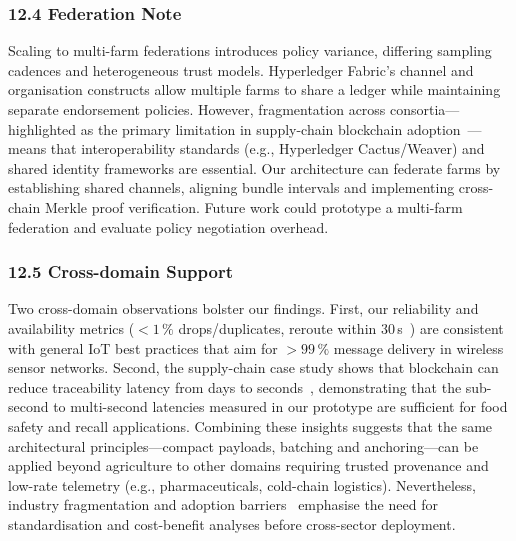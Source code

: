 \documentclass[12pt,onecolumn]{IEEEtran} %
\begin{document}
\subsubsection*{12.4 Federation Note}
Scaling to multi-farm federations introduces policy variance, differing sampling cadences and heterogeneous trust models. Hyperledger Fabric’s channel and organisation constructs allow multiple farms to share a ledger while maintaining separate endorsement policies. However, fragmentation across consortia—highlighted as the primary limitation in supply-chain blockchain adoption~\cite{gsci_blockchain_supplychain_2022}—means that interoperability standards (e.g., Hyperledger Cactus/Weaver) and shared identity frameworks are essential. Our architecture can federate farms by establishing shared channels, aligning bundle intervals and implementing cross-chain Merkle proof verification. Future work could prototype a multi-farm federation and evaluate policy negotiation overhead.

\subsubsection*{12.5 Cross-domain Support}
Two cross-domain observations bolster our findings. First, our reliability and availability metrics ($<1\,\%$ drops/duplicates, reroute within 30\,s~\cite{ref76853680998234}) are consistent with general IoT best practices that aim for $>99\,\%$ message delivery in wireless sensor networks. Second, the supply-chain case study shows that blockchain can reduce traceability latency from days to seconds~\cite{hyperledger_walmart_2020}, demonstrating that the sub-second to multi-second latencies measured in our prototype are sufficient for food safety and recall applications. Combining these insights suggests that the same architectural principles—compact payloads, batching and anchoring—can be applied beyond agriculture to other domains requiring trusted provenance and low-rate telemetry (e.g., pharmaceuticals, cold-chain logistics). Nevertheless, industry fragmentation and adoption barriers~\cite{gsci_blockchain_supplychain_2022} emphasise the need for standardisation and cost-benefit analyses before cross-sector deployment.
\end{document}
